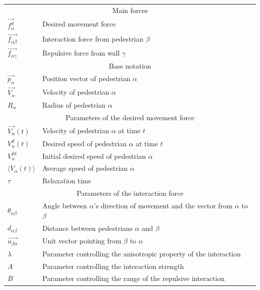 \begin{table}[h]
    \centering
    \begin{tabular}{l l}
        \toprule
        \multicolumn{2}{c}{\textsf{Main forces}}\\
        $\overrightarrow{f_{\alpha}^{d}}$ & Desired movement force\\
        $\overrightarrow{f_{\alpha \beta}}$ & Interaction force from
        pedestrian $\beta$\\
        $\overrightarrow{f_{\alpha \gamma}}$ & Repulsive force from wall
        $\gamma$\\

        \midrule
        \multicolumn{2}{c}{\textsf{Base notation}}\\
        $\overrightarrow{p_{\alpha}}$ & Position vector of pedestrian
        $\alpha$\\
        $\overrightarrow{V_{\alpha}}$ & Velocity of pedestrian $\alpha$ \\
        \addlinespace[0.3em]
        $R_\alpha$ & Radius of pedestrian $\alpha$\\

        \midrule
        \multicolumn{2}{c}{\textsf{Parameters of the desired movement force}}\\
        $\overrightarrow{V_{\alpha}}(t)$ & Velocity of pedestrian $\alpha$
        at time $t$\\
        $V_{\alpha}^{d}(t)$ & Desired speed of pedestrian $\alpha$ at time
        $t$\\
        $V_{\alpha}^{Id}$ & Initial desired speed of pedestrian $\alpha$ \\
        $\langle V_{\alpha}(t) \rangle$ & Average speed of pedestrian
        $\alpha$ \\
        $\tau$& Relaxation time \\

        \midrule
        \multicolumn{2}{c}{\textsf{Parameters of the interaction force}}\\
        $\theta_{\alpha \beta}$ & Angle between $\alpha$'s direction of
        movement and the vector from $\alpha$ to $\beta$\\
        $d_{\alpha \beta}$& Distance between pedestrians $\alpha$ and $\beta$ \\
        $\overrightarrow{u_{\beta \alpha}}$& Unit vector pointing from $\beta$ to $\alpha$ \\
        $\lambda$& Parameter controlling the anisotropic property of the
        interaction\\
        $A$& Parameter controlling the interaction strength \\
        $B$& Parameter controlling the range of the repulsive interaction  \\


\end{tabular}
\end{table}
